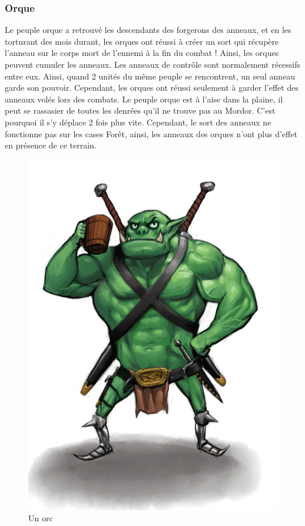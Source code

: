 \subsubsection{Orque}

Le peuple orque a retrouvé les descendants des forgerons des anneaux, et en les torturant des mois durant, les orques ont réussi à créer un sort qui récupère l'anneau sur le corps mort de l'ennemi à la fin du combat ! Ainsi, les orques peuvent cumuler les anneaux.
\newline
\newline
Les anneaux de contrôle sont normalement récessifs entre eux. Ainsi, quand 2 unités du même peuple se rencontrent, un seul anneau garde son pouvoir. Cependant, les orques ont réussi seulement à garder l'effet des anneaux volés lors des combats.
\newline
\newline
Le peuple orque est à l'aise dans la plaine, il peut se rassasier de toutes les denrées qu'il ne trouve pas au Mordor. C'est pourquoi il s'y déplace 2 fois plus vite. 
\newline Cependant, le sort des anneaux ne fonctionne pas sur les cases Forêt, ainsi, les anneaux des orques n'ont plus d'effet en présence de ce terrain.

\begin{figure}[!h]
\centering
\includegraphics[scale=0.10]{img/orc.png}
\caption{Un orc}
\end{figure}

